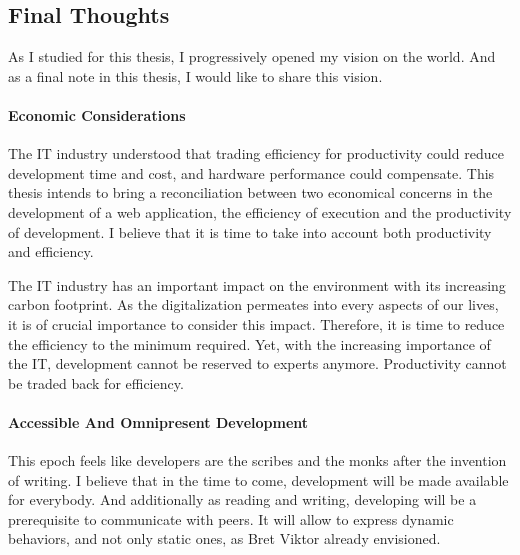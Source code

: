

\subsection{Final Thoughts}

As I studied for this thesis, I progressively opened my vision on the world.
And as a final note in this thesis, I would like to share this vision.

\paragraph{Economic Considerations}

The IT industry understood that trading efficiency for productivity could reduce development time and cost, and hardware performance could compensate.
This thesis intends to bring a reconciliation between two economical concerns in the development of a web application, the efficiency of execution and the productivity of development.
I believe that it is time to take into account both productivity and efficiency.

The IT industry has an important impact on the environment with its increasing carbon footprint.
As the digitalization permeates into every aspects of our lives, it is of crucial importance to consider this impact.
Therefore, it is time to reduce the efficiency to the minimum required.
Yet, with the increasing importance of the IT, development cannot be reserved to experts anymore.
Productivity cannot be traded back for efficiency.


\paragraph{Accessible And Omnipresent Development}

This epoch feels like developers are the scribes and the monks after the invention of writing.
I believe that in the time to come, development will be made available for everybody.
And additionally as reading and writing, developing will be a prerequisite to communicate with peers.
It will allow to express dynamic behaviors, and not only static ones, as Bret Viktor already envisioned.

